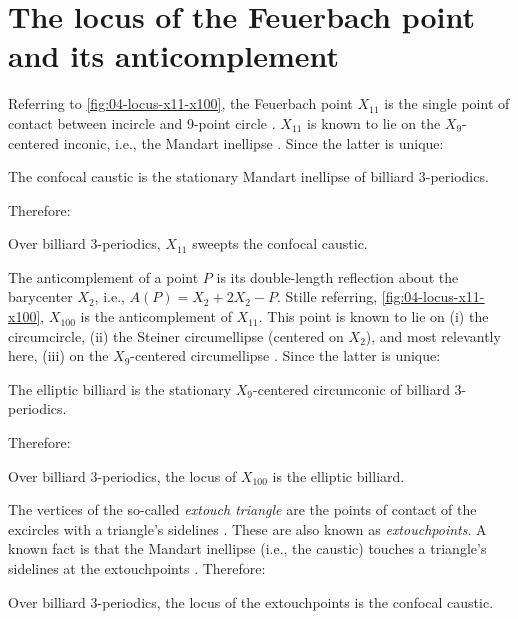 \section{The locus of the Feuerbach point and its anticomplement}

Referring to \cref{fig:04-locus-x11-x100}, the Feuerbach point $X_{11}$ is the single point of contact between incircle and 9-point circle \cite[X(11)]{mw}. $X_{11}$ is known to lie on the $X_{9}$-centered inconic, i.e., the  Mandart inellipse \cite[Mandart inellipse]{mw}. Since the latter is unique:

\begin{observation}
The confocal caustic is the stationary Mandart inellipse of billiard 3-periodics.
\end{observation}

Therefore:

\begin{proposition}
Over billiard 3-periodics, $X_{11}$ sweepts the confocal caustic.
\end{proposition}

The anticomplement of a point $P$ is its double-length reflection about the barycenter $X_2$, i.e., $A(P) = X_2+2 X_2-P$. Stille referring,  \cref{fig:04-locus-x11-x100}, $X_{100}$ is the anticomplement of $X_{11}$. This point is known to lie on (i) the circumcircle, (ii) the Steiner circumellipse (centered on $X_2$), and most relevantly here, (iii) on the $X_9$-centered circumellipse \cite[X(9)]{etc}. Since the latter is unique:

\begin{observation}
The elliptic billiard is the stationary $X_9$-centered circumconic of billiard 3-periodics.
\end{observation}

Therefore:

\begin{proposition}
Over billiard 3-periodics, the locus of $X_{100}$ is the elliptic billiard.
\end{proposition}

The vertices of the so-called {\em extouch triangle} are the points of contact of the excircles with a triangle's sidelines \cite[Extouch triangle]{mw}. These are also known as {\em extouchpoints}. A known fact is that the Mandart inellipse (i.e., the caustic) touches a triangle's sidelines at the extouchpoints \cite[Mandart inellipse]{mw}. Therefore:

\begin{proposition}
Over billiard 3-periodics, the locus of the extouchpoints is the confocal caustic.
\end{proposition}

